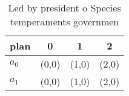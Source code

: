 \documentclass[a4paper]{article}
\begin{document}
\begin{table}
\begin{adjustbox}{width=0.6\columnwidth}
\begin{tabular}{|l|l|l|l|}
\hline
\textbf{plan} & \multicolumn{1}{c|}{\textbf{0}} & \multicolumn{1}{c|}{\textbf{1}} & \multicolumn{1}{c|}{\textbf{2}} \\ \hline
\textbf{$a_0$}  & (0,0) & (1,0) & (2,0) \\ \hline
\textbf{$a_1$}  & (0,0) & (1,0) & (2,0) \\ \hline
\end{tabular}
\end{adjustbox}
\caption{Led by president o Species temperaments governmen
}
\end{table}
\end{document}
